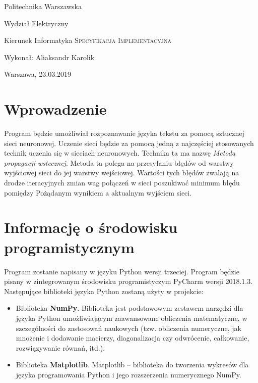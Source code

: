 \documentclass[8pt]{article}
\begin{document}
	\begin{titlepage}
		\begin{center}
			\Large
			Politechnika Warszawska 
			
			Wydział Elektryczny 
			
			Kierunek Informatyka 
			\vfill
			\Huge \textsc{Specyfikacja Implementacyjna}
		\end{center}
		\vfill
		
		
		
		\begin{center}
			\Large Wykonał: Aliaksandr Karolik 
		\end{center}
		\begin{center}
			\Large	Warszawa, 23.03.2019
		\end{center}
	
		
		
	\end{titlepage}
	\newpage
	\Large\tableofcontents
	
	
	\newpage

	\section {Wprowadzenie}
	\hspace*{1 cm} Program będzie umożliwiał rozpoznawanie języka tekstu za pomocą sztucznej sieci neuronowej. Uczenie sieci będzie za pomocą jedną z najczęściej stosowanych technik uczenia się w sieciach neuronowych. Technika ta ma nazwę \textit{Metoda propagacji wstecznej}. \newline 
	\hspace*{1 cm}Metoda ta polega na przesyłaniu błędów od warstwy wyjściowej sieci do jej warstwy wejściowej. Wartości tych błędów zwalają na drodze iteracyjnych zmian wag połączeń w sieci poszukiwać minimum błędu pomiędzy Pożądanym wynikiem a aktualnym wyjściem sieci.
  \newline
  
  \section{Informację o środowisku programistycznym }
	\hspace*{1 cm}Program zostanie napisany w języku Python wersji trzeciej. Program będzie pisany w zintegrowanym środowisku programistyczym PyCharm wersji 2018.1.3. \newline
	\hspace*{1 cm}Następujące biblioteki języka Python zostaną użyty w projekcie:
	\begin{itemize}
	\item Biblioteka \textbf{NumPy}. Biblioteka jest podstawowym zestawem narzędzi dla języka Python umożliwiającym zaawansowane obliczenia matematyczne, w szczególności do zastosowań naukowych (tzw. obliczenia numeryczne, jak mnożenie i dodawanie macierzy, diagonalizacja czy odwrócenie, całkowanie, rozwiązywanie równań, itd.).
	\item Biblioteka \textbf{Matplotlib}.  Matplotlib – biblioteka do tworzenia wykresów dla języka programowania Python i jego rozszerzenia numerycznego NumPy. 
	\end{itemize}
\end{document}
